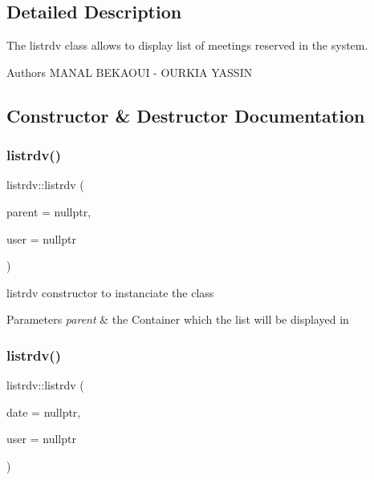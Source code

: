 \subsection{Detailed Description}
The listrdv class allows to display list of meetings reserved in the system. 

\begin{DoxyAuthor}{Authors}
M\+A\+N\+AL B\+E\+K\+A\+O\+UI -\/ O\+U\+R\+K\+IA Y\+A\+S\+S\+IN 
\end{DoxyAuthor}


\subsection{Constructor \& Destructor Documentation}
\mbox{\label{classlistrdv_a90053e4d9e434e65d2ddd6c654ecbe7b}} 
\subsubsection{\texorpdfstring{listrdv()}{listrdv()}\hspace{0.1cm}{\footnotesize\ttfamily [1/2]}}
{\footnotesize\ttfamily listrdv\+::listrdv (\begin{DoxyParamCaption}\item[{Q\+Widget $\ast$}]{parent = {\ttfamily nullptr},  }\item[{Q\+String}]{user = {\ttfamily nullptr} }\end{DoxyParamCaption})\hspace{0.3cm}{\ttfamily [explicit]}}



listrdv constructor to instanciate the class 


\begin{DoxyParams}{Parameters}
{\em parent} & the Container which the list will be displayed in \\
\hline
\end{DoxyParams}
\mbox{\label{classlistrdv_aec2ba2f32006ecb1901a8fc1d947ea6f}} 
\subsubsection{\texorpdfstring{listrdv()}{listrdv()}\hspace{0.1cm}{\footnotesize\ttfamily [2/2]}}
{\footnotesize\ttfamily listrdv\+::listrdv (\begin{DoxyParamCaption}\item[{Q\+String}]{date = {\ttfamily nullptr},  }\item[{Q\+String}]{user = {\ttfamily nullptr} }\end{DoxyParamCaption})\hspace{0.3cm}{\ttfamily [explicit]}}



